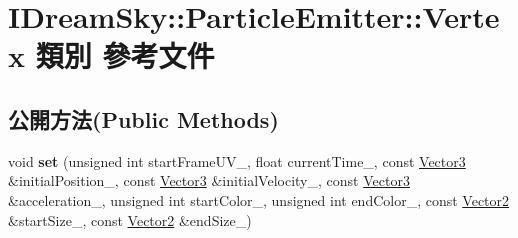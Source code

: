 \hypertarget{class_i_dream_sky_1_1_particle_emitter_1_1_vertex}{}\section{I\+Dream\+Sky\+:\+:Particle\+Emitter\+:\+:Vertex 類別 參考文件}
\label{class_i_dream_sky_1_1_particle_emitter_1_1_vertex}
\subsection*{公開方法(Public Methods)}
\begin{DoxyCompactItemize}
\item 
void {\bfseries set} (unsigned int start\+Frame\+U\+V\+\_\+, float current\+Time\+\_\+, const \hyperlink{class_i_dream_sky_1_1_vector3}{Vector3} \&initial\+Position\+\_\+, const \hyperlink{class_i_dream_sky_1_1_vector3}{Vector3} \&initial\+Velocity\+\_\+, const \hyperlink{class_i_dream_sky_1_1_vector3}{Vector3} \&acceleration\+\_\+, unsigned int start\+Color\+\_\+, unsigned int end\+Color\+\_\+, const \hyperlink{class_i_dream_sky_1_1_vector2}{Vector2} \&start\+Size\+\_\+, const \hyperlink{class_i_dream_sky_1_1_vector2}{Vector2} \&end\+Size\+\_\+)\hypertarget{class_i_dream_sky_1_1_particle_emitter_1_1_vertex_ae5d0914b807e892aab8ceaeb4bd0da8c}{}\label{class_i_dream_sky_1_1_particle_emitter_1_1_vertex_ae5d0914b807e892aab8ceaeb4bd0da8c}

\end{DoxyCompactItemize}
